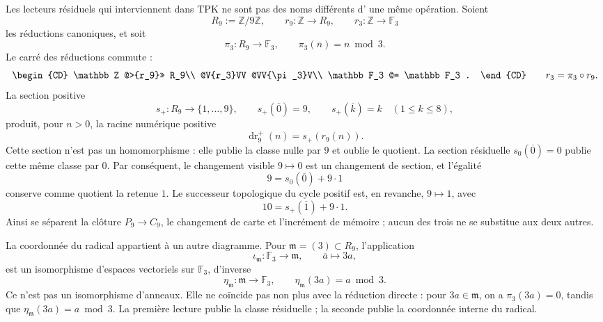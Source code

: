 Les lecteurs résiduels qui interviennent dans TPK ne sont pas des noms différents d'
une même opération. Soient
\[
 R_9:=\mathbb Z/9\mathbb Z,
 \qquad
 r_9:\mathbb Z\longrightarrow R_9,
 \qquad
 r_3:\mathbb Z\longrightarrow\mathbb F_3
\]
les réductions canoniques, et soit
\[
 \pi_3:R_9\longrightarrow\mathbb F_3,
 \qquad \pi_3(\overline n)=n\bmod3.
\]
Le carré des réductions commute :
\begin{equation}
\begin{CD}
 \mathbb Z @>{r_9}>> R_9\\
 @V{r_3}VV @VV{\pi_3}V\\
 \mathbb F_3 @= \mathbb F_3 .
\end{CD}
\qquad
 r_3=\pi_3\circ r_9.
\label{eq:diagrama-reducciones-9-3-rev3}
\end{equation}
La section positive
\[
 s_+:R_9\longrightarrow\{1,\ldots,9\},
 \qquad
 s_+(\overline0)=9,
 \qquad
 s_+(\overline k)=k\quad(1\le k\le8),
\]
produit, pour \(n>0\), la racine numérique positive
\[
 \operatorname{dr}_9^+(n)=s_+(r_9(n)).
\]
Cette section n'est pas un homomorphisme : elle publie la classe nulle par \(9\) et
oublie le quotient. La section résiduelle \(s_0(\overline0)=0\) publie cette
même classe par \(0\). Par conséquent, le changement visible \(9\mapsto0\) est un
changement de section, et l'égalité
\[
 9=s_0(\overline0)+9\cdot1
\]
conserve comme quotient la retenue \(1\). Le successeur topologique du cycle
positif est, en revanche, \(9\mapsto1\), avec
\[
 10=s_+(\overline1)+9\cdot1.
\]
Ainsi se séparent la clôture \(P_9\to C_9\), le changement de carte et l'incrément
de mémoire ; aucun des trois ne se substitue aux deux autres.

La coordonnée du radical appartient à un autre diagramme. Pour
\(\mathfrak m=(3)\subset R_9\), l'application
\[
 \iota_{\mathfrak m}:\mathbb F_3\longrightarrow\mathfrak m,
 \qquad \overline a\longmapsto3a,
\]
est un isomorphisme d'espaces vectoriels sur \(\mathbb F_3\), d'inverse
\begin{equation}
 \eta_{\mathfrak m}:\mathfrak m\longrightarrow\mathbb F_3,
 \qquad
 \eta_{\mathfrak m}(3a)=a\bmod3.
 \label{eq:coordenada-radical-compatibilidad-rev3}
\end{equation}
Ce n'est pas un isomorphisme d'anneaux. Elle ne coïncide pas non plus avec la réduction directe :
pour \(3a\in\mathfrak m\), on a \(\pi_3(3a)=0\), tandis que
\(\eta_{\mathfrak m}(3a)=a\bmod3\). La première lecture publie la classe
résiduelle ; la seconde publie la coordonnée interne du radical.

